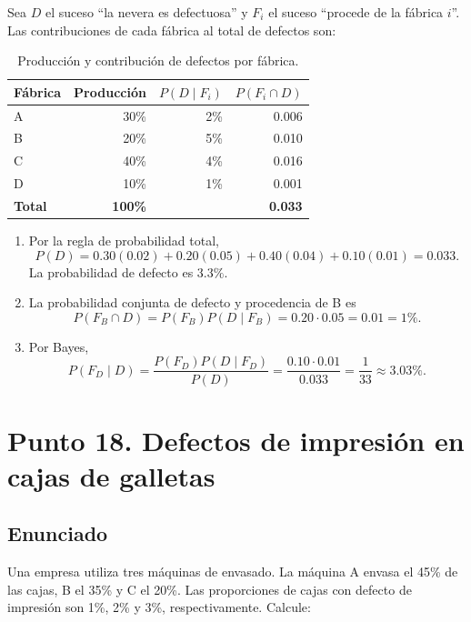 \documentclass[12pt]{article}
\begin{document}
Sea $D$ el suceso ``la nevera es defectuosa'' y $F_i$ el suceso ``procede de la fábrica $i$''. Las contribuciones de cada fábrica al total de defectos son:

\begin{table}[H]
\centering
\small
\renewcommand{\arraystretch}{1.15}
\begin{tabular}{|l|r|r|r|}
\hline
\textbf{Fábrica} & \textbf{Producción} & \textbf{$P(D\mid F_i)$} & \textbf{$P(F_i\cap D)$} \\ \hline
A & 30\% & 2\% & 0.006 \\ \hline
B & 20\% & 5\% & 0.010 \\ \hline
C & 40\% & 4\% & 0.016 \\ \hline
D & 10\% & 1\% & 0.001 \\ \hline
\textbf{Total} & \textbf{100\%} & & \textbf{0.033} \\ \hline
\end{tabular}
\caption{Producción y contribución de defectos por fábrica.}
\label{tab:neveras-fabricas}
\end{table}

\begin{enumerate}
    \item Por la regla de probabilidad total,
    \[
    P(D)=0.30(0.02)+0.20(0.05)+0.40(0.04)+0.10(0.01)=0.033.
    \]
    La probabilidad de defecto es $3.3\%$.
    \item La probabilidad conjunta de defecto y procedencia de B es
    \[
    P(F_B\cap D)=P(F_B)P(D\mid F_B)=0.20\cdot0.05=0.01=1\%.
    \]
    \item Por Bayes,
    \[
    P(F_D\mid D)=\frac{P(F_D)P(D\mid F_D)}{P(D)}
    =\frac{0.10\cdot0.01}{0.033}=\frac{1}{33}\approx3.03\%.
    \]
\end{enumerate}

\section*{Punto 18. Defectos de impresión en cajas de galletas}

\subsection*{Enunciado}

Una empresa utiliza tres máquinas de envasado. La máquina A envasa el 45\% de las cajas, B el 35\% y C el 20\%. Las proporciones de cajas con defecto de impresión son 1\%, 2\% y 3\%, respectivamente. Calcule:
\end{document}
